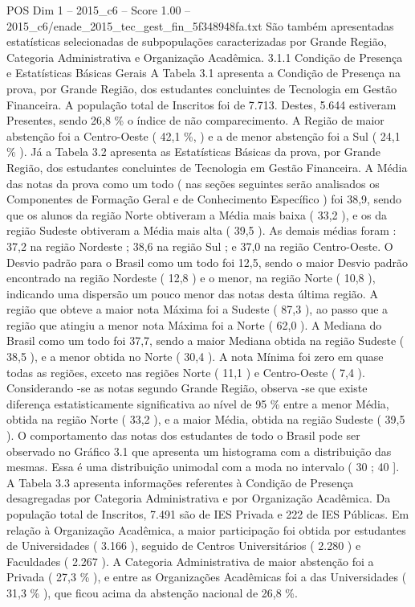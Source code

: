 \begin{textsample}{POS Dim 1 – 2015\_c6 – Score 1.00 – 2015\_c6/enade\_2015\_tec\_gest\_fin\_5f348948fa.txt}
São também apresentadas estatísticas selecionadas de subpopulações caracterizadas por Grande Região, Categoria Administrativa e Organização Acadêmica. 3.1.1 Condição de Presença e Estatísticas Básicas Gerais A Tabela 3.1 apresenta a Condição de Presença na prova, por Grande Região, dos estudantes concluintes de Tecnologia em Gestão Financeira.
A população total de Inscritos foi de 7.713.
Destes, 5.644 estiveram Presentes, sendo 26,8 \% o índice de não comparecimento.
A Região de maior abstenção foi a Centro-Oeste ( 42,1 \%, ) e a de menor abstenção foi a Sul ( 24,1 \% ).
Já a Tabela 3.2 apresenta as Estatísticas Básicas da prova, por Grande Região, dos estudantes concluintes de Tecnologia em Gestão Financeira.
A Média das notas da prova como um todo ( nas seções seguintes serão analisados os Componentes de Formação Geral e de Conhecimento Específico ) foi 38,9, sendo que os alunos da região Norte obtiveram a Média mais baixa ( 33,2 ), e os da região Sudeste obtiveram a Média mais alta ( 39,5 ).
As demais médias foram : 37,2 na região Nordeste ; 38,6 na região Sul ; e 37,0 na região Centro-Oeste.
O Desvio padrão para o Brasil como um todo foi 12,5, sendo o maior Desvio padrão encontrado na região Nordeste ( 12,8 ) e o menor, na região Norte ( 10,8 ), indicando uma dispersão um pouco menor das notas desta última região.
A região que obteve a maior nota Máxima foi a Sudeste ( 87,3 ), ao passo que a região que atingiu a menor nota Máxima foi a Norte ( 62,0 ).
A Mediana do Brasil como um todo foi 37,7, sendo a maior Mediana obtida na região Sudeste ( 38,5 ), e a menor obtida no Norte ( 30,4 ).
A nota Mínima foi zero em quase todas as regiões, exceto nas regiões Norte ( 11,1 ) e Centro-Oeste ( 7,4 ).
Considerando -se as notas segundo Grande Região, observa -se que existe diferença estatisticamente significativa ao nível de 95 \% entre a menor Média, obtida na região Norte ( 33,2 ), e a maior Média, obtida na região Sudeste ( 39,5 ).
O comportamento das notas dos estudantes de todo o Brasil pode ser observado no Gráfico 3.1 que apresenta um histograma com a distribuição das mesmas.
Essa é uma distribuição unimodal com a moda no intervalo ( 30 ; 40 ].
A Tabela 3.3 apresenta informações referentes à Condição de Presença desagregadas por Categoria Administrativa e por Organização Acadêmica.
Da população total de Inscritos, 7.491 são de IES Privada e 222 de IES Públicas.
Em relação à Organização Acadêmica, a maior participação foi obtida por estudantes de Universidades ( 3.166 ), seguido de Centros Universitários ( 2.280 ) e Faculdades ( 2.267 ).
A Categoria Administrativa de maior abstenção foi a Privada ( 27,3 \% ), e entre as Organizações Acadêmicas foi a das Universidades ( 31,3 \% ), que ficou acima da abstenção nacional de 26,8 \%.

\end{textsample}
